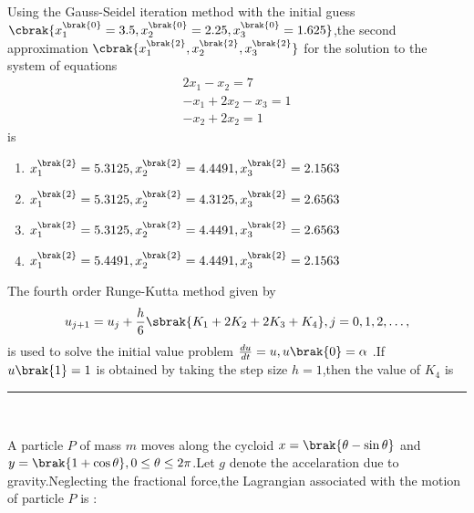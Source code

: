 \iffalse
\chapter{2014}
\author{EE24BTECH11011}
\section{ma}
\fi
       \item Using the Gauss-Seidel iteration method with the initial guess $\cbrak{x_1^{\brak{0}} = 3.5 , x_2^{\brak{0}} = 2.25,x_3^{\brak{0}} = 1.625}$,the second approximation $\cbrak{x_1^{\brak{2}},x_2^{\brak{2}},x_3^{\brak{2}}}$ for the solution to the system of equations
       \begin{align}
           2x_1 - x_2 = 7\\
           -x_1 +2x_2-x_3 =1\\
           -x_2+2x_2=1
       \end{align}
       is
       \begin{enumerate}
           \item $x_1^{\brak{2}}=5.3125, x_2^{\brak{2}}=4.4491, x_3^{\brak{2}} = 2.1563$\\
            \item $x_1^{\brak{2}}=5.3125, x_2^{\brak{2}}=4.3125, x_3^{\brak{2}} = 2.6563$\\
             \item $x_1^{\brak{2}}=5.3125, x_2^{\brak{2}}=4.4491, x_3^{\brak{2}} = 2.6563$\\
              \item $x_1^{\brak{2}}=5.4491, x_2^{\brak{2}}=4.4491, x_3^{\brak{2}} = 2.1563$\\
       \end{enumerate}
       \item The fourth order Runge-Kutta method given by
       \begin{align}
           u_{j+1} = u_j +\frac{h}{6}\sbrak{K_1+2K_2+2K_3+K_4}, j=0,1,2,\dots,
       \end{align}
       is used to solve the initial value problem $\frac{du}{dt}=u , u\brak{0}=\alpha$ .If $u\brak{1}=1$ is obtained by taking the step size  $h=1$,then the value of $K_4$ is \rule{3cm}{0.15mm}\\
       \item A particle $P$ of mass $m$ moves along the cycloid $x = \brak{\theta - \sin\theta}$ and $y = \brak{1+\cos\theta} , 0 \leq \theta \leq 2\pi$.Let $g$ denote the accelaration due to gravity.Neglecting the fractional force,the Lagrangian associated with the motion of particle $P$ is :
